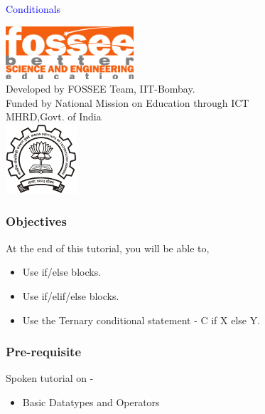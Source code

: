 \documentclass[presentation]{beamer}
\title{}
\author{FOSSEE}
\date{}
\begin{document}
\begin{frame}

\begin{center}
\vspace{12pt}
\textcolor{blue}{\huge Conditionals}
\end{center}
\vspace{18pt}
\begin{center}
\vspace{10pt}
\includegraphics[scale=0.95]{../images/fossee-logo.png}\\
\vspace{5pt}
\scriptsize Developed by FOSSEE Team, IIT-Bombay. \\ 
\scriptsize Funded by National Mission on Education through ICT\\
\scriptsize  MHRD,Govt. of India\\
\includegraphics[scale=0.30]{../images/iitb-logo.png}\\
\end{center}
\end{frame}
\begin{frame}
\frametitle{Objectives}
\label{sec-2}

At the end of this tutorial, you will be able to, 


\begin{itemize}
\item Use if/else blocks.
\item Use if/elif/else blocks.
\item Use the Ternary conditional statement - C if X else Y.
\end{itemize}
  
\end{frame}
\begin{frame}
\frametitle{Pre-requisite}
\label{sec-3}

Spoken tutorial on -

\begin{itemize}
\item Basic Datatypes and Operators
\end{itemize}
\end{frame}
\end{document}
